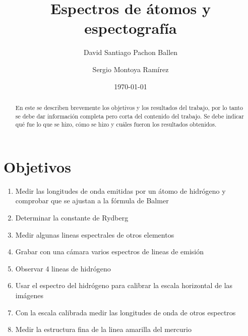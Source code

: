 \documentclass[a4paper, amsfonts, amssymb, amsmath, reprint, showkeys, nofootinbib, twoside]{revtex4-1}
\begin{document}
\title{Espectros de átomos y espectografía}


\author{David Santiago Pachon Ballen}

  
\author{Sergio Montoya Ramírez}


\date{\today} %

\begin{abstract}

En este se describen brevemente los objetivos y los resultados del trabajo, por lo tanto se debe dar información completa pero corta del contenido del trabajo. Se debe indicar qué fue lo que se hizo, cómo se hizo y cuáles fueron los resultados obtenidos.

\end{abstract}

\maketitle
\section{Objetivos}
\begin{enumerate}
    \item Medir las longitudes de onda emitidas por un átomo de hidrógeno y comprobar que se ajustan a la fórmula de Balmer
    \item Determinar la constante de Rydberg
    \item Medir algunas lineas espectrales de otros elementos
    \item Grabar con una cámara varios espectros de lineas de emisión
    \item Observar 4 lineas de hidrógeno
    \item Usar el espectro del hidrógeno para calibrar la escala horizontal de las imágenes
    \item Con la escala calibrada medir las longitudes de onda de otros espectros
    \item Medir la estructura fina de la linea amarilla del mercurio
\end{enumerate}
\end{document}
